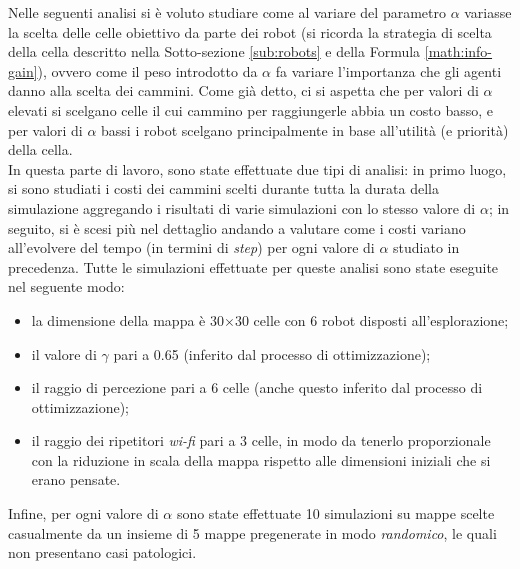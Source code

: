 Nelle seguenti analisi si è voluto studiare come al variare del parametro $\alpha$ variasse la scelta delle celle obiettivo da parte dei robot (si ricorda la strategia di scelta della cella descritto nella Sotto-sezione \ref{sub:robots} e della Formula \ref{math:info-gain}), ovvero come il peso introdotto da $\alpha$ fa variare l'importanza che gli agenti danno alla scelta dei cammini.
Come già detto, ci si aspetta che per valori di $\alpha$ elevati si scelgano celle il cui cammino per raggiungerle abbia un costo basso, e per valori di $\alpha$ bassi i robot scelgano principalmente in base all'utilità (e priorità) della cella.\\
In questa parte di lavoro, sono state effettuate due tipi di analisi: in primo luogo, si sono studiati i costi dei cammini scelti durante tutta la durata della simulazione aggregando i risultati di varie simulazioni con lo stesso valore di $\alpha$; in seguito, si è scesi più nel dettaglio andando a valutare come i costi variano all'evolvere del tempo (in termini di \textit{step}) per ogni valore di $\alpha$ studiato in precedenza.
Tutte le simulazioni effettuate per queste analisi sono state eseguite nel seguente modo:
\begin{itemize}
	\item la dimensione della mappa è 30$\times$30 celle con 6 robot disposti all'esplorazione;
	\item il valore di $\gamma$ pari a 0.65 (inferito dal processo di ottimizzazione);
	\item il raggio di percezione pari a 6 celle (anche questo inferito dal processo di ottimizzazione);
	\item il raggio dei ripetitori \textit{wi-fi} pari a 3 celle, in modo da tenerlo proporzionale con la riduzione in scala della mappa rispetto alle dimensioni iniziali che si erano pensate.
\end{itemize}
Infine, per ogni valore di $\alpha$ sono state effettuate 10 simulazioni su mappe scelte casualmente da un insieme di 5 mappe pregenerate in modo \textit{randomico}, le quali non presentano casi patologici.

